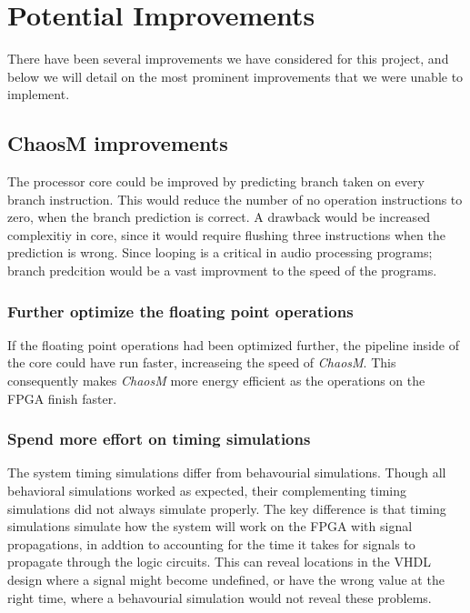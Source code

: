 \section{Potential Improvements}

There have been several improvements we have considered for this project, and
below we will detail on the most prominent improvements that we were unable to
implement.

\subsection{ChaosM improvements}

The processor core could be improved by predicting branch taken on every branch instruction. This would reduce 
the number of no operation instructions to zero, when the branch prediction is correct. A drawback would be increased 
complexitiy in core, since it would require flushing three instructions when the prediction is wrong. Since looping is
a critical in audio processing programs; branch predcition would be a vast improvment to the speed of the programs. 
\subsubsection{Further optimize the floating point operations}

If the floating point operations had been optimized further, the pipeline inside
of the core could have run faster, increaseing the speed of
\textit{ChaosM}. This consequently makes \textit{ChaosM} more energy efficient as the operations on the FPGA finish faster.

\subsubsection{Spend more effort on timing simulations}

The system timing simulations differ from behavourial simulations. Though all behavioral 
simulations worked as expected, their complementing timing simulations did 
not always simulate properly.
The key difference is that timing simulations simulate how the system will work
on the FPGA with signal propagations, in addtion to accounting for the time it
takes for signals to propagate through the logic circuits. This can reveal
locations in the VHDL design where a signal might become undefined, or have the
wrong value at the right time, where a behavourial simulation would not reveal
these problems. 

